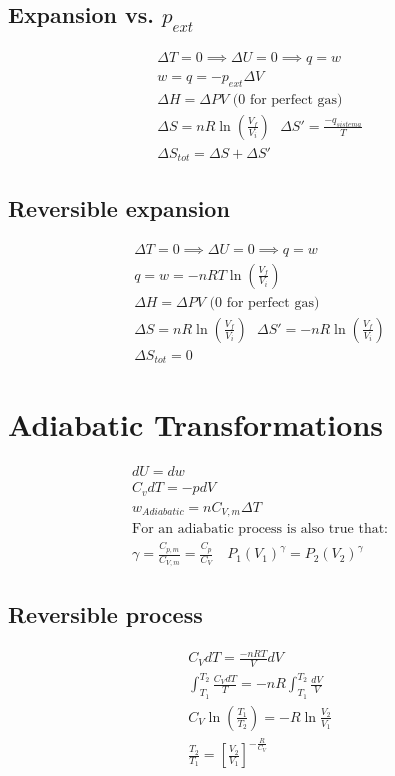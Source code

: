 \documentclass[Master.tex]{subfiles}
\begin{document}
\begin{multicols}{2}
		  \subsection{Expansion vs. $p_{ext}$}
				   \begin{gather*}
						    \Delta T = 0 \implies \Delta U = 0 \implies q = w\\
						    w = q = -p_{ext} \Delta V \\
						    \Delta H = \Delta PV \text{ (0 for perfect gas)}\\
						    \Delta S = nR\ln (\frac{V_f}{V_i}) ~ ~ ~\Delta S' = \frac{-q_{sistema}}{T}\\
						    \Delta S_{tot} = \Delta S + \Delta S'
				   \end{gather*}

		  \subsection{Reversible expansion}
				   \begin{gather*}
						    \Delta T = 0 \implies \Delta U = 0 \implies q = w\\
						    q = w = -nRT\ln (\frac{V_f}{V_i})\\
						    \Delta H = \Delta PV\text{ (0 for perfect gas)}\\
						    \Delta S = nR \ln (\frac{V_f}{V_i}) ~ ~ ~\Delta S' = - nR\ln (\frac{V_f}{V_i})\\
						    \Delta S_{tot} = 0
				   \end{gather*}

		 \section{Adiabatic Transformations}

		  \begin{gather*}
				   dU = dw \\
				   C_{v}dT = -pdV \\
				   w_{Adiabatic} = nC_{V,m}\Delta T\\
				   \text{For an adiabatic process is also true that:} \\
				   \gamma = \frac{C_{p,m} }{C_{V,m} } = \frac{C_{p}  }{C_{V} } \quad P_1(V_1)^{\gamma} = P_2(V_2 )^{\gamma }
		  \end{gather*}

		  \subsection{Reversible process}
				   \begin{gather*}
						    C_{V}dT = \frac{-nRT}{V}dV\\
						    \int _{T_1}^{T_2} \frac{C_{V}dT }{T}  = -nR\int _{T_1}^{T_2}\frac{dV}{V}\\
						    C_{V}\ln \left(\frac{T_1}{T_2} \right) = -R\ln \frac{V_2}{V_1} \\
						    \frac{T_2}{T_1}=\left [\frac{V_2}{V_1}\right]^{-\frac{R}{C_{V}}}
				   \end{gather*}


\end{multicols}
\end{document}
